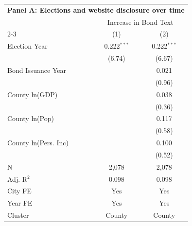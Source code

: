 \begingroup
\centering
\begin{tabular*}{\textwidth}{@{\extracolsep{\fill}}lcc}
\multicolumn{3}{l}{\textbf{Panel A: Elections and website disclosure over time}}\\

\addlinespace
   \toprule
    & \multicolumn{2}{c}{Increase in Bond Text}\\
   \cmidrule(lr){2-3}
                        & (1)           & (2)\\  
   \midrule 
   Election Year        & 0.222$^{***}$ & 0.222$^{***}$\\   
                        & (6.74)       & (6.67)\\   
   Bond Issuance Year   &               & 0.021\\   
                        &               & (0.96)\\   
   County ln(GDP)       &               & 0.038\\   
                        &               & (0.36)\\   
   County ln(Pop)       &               & 0.117\\   
                        &               & (0.58)\\   
   County ln(Pers. Inc) &               & 0.100\\   
                        &               & (0.52)\\   
   \hline
   N         & 2,078         & 2,078\\  
   Adj. R$^2$       & 0.098         & 0.098\\  
   City FE              & Yes           & Yes\\  
   Year FE              & Yes           & Yes\\  
   Cluster              & County & County\\  
   \bottomrule
\end{tabular*}
\par\endgroup
